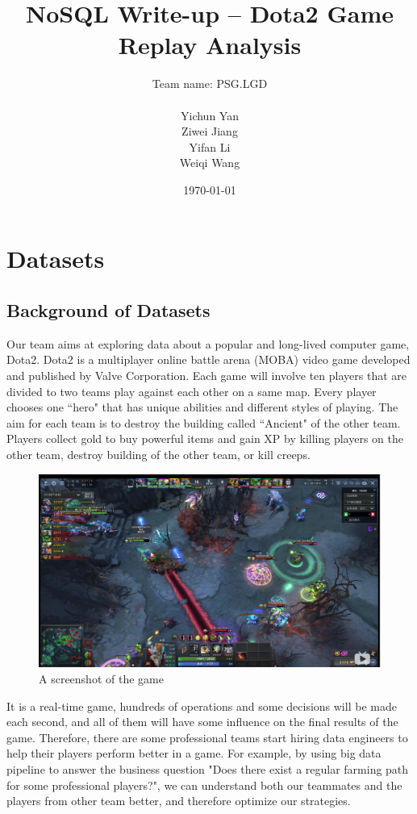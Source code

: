 \documentclass{article}
\title{NoSQL Write-up -- Dota2 Game Replay Analysis}
\author{
    Team name: PSG.LGD \\ \\
    Yichun Yan \\
    Ziwei Jiang \\
    Yifan Li \\
    Weiqi Wang
}
\date{\today}
\begin{document}
\maketitle

\tableofcontents
\clearpage


\section{Datasets}

\subsection{Background of Datasets}

Our team aims at exploring data about a popular and long-lived computer game, Dota2. Dota2 is a multiplayer online battle arena (\gls{MOBA}) video game developed and published by Valve Corporation. Each game will involve ten players that are divided to two teams play against each other on a same map. Every player chooses one ``hero" that has unique abilities and different styles of playing. The aim for each team is to destroy the building called ``\gls{Ancient}" of the other team. Players collect \gls{gold} to buy powerful items and gain \gls{XP} by killing players on the other team, destroy building of the other team, or kill \gls{creeps}.

\begin{figure}[H]
    \centering
    \includegraphics[width=\linewidth]{pic/combat.png}
    \caption{A screenshot of the game}
\end{figure}

It is a real-time game, hundreds of operations and some decisions will be made each second, and all of them will have some influence on the final results of the game. Therefore, there are some professional teams start hiring data engineers to help their players perform better in a game. For example, by using big data pipeline to answer the business question "Does there exist a regular farming path for some professional players?", we can understand both our teammates and the players from other team better, and therefore optimize our strategies.
\end{document}
